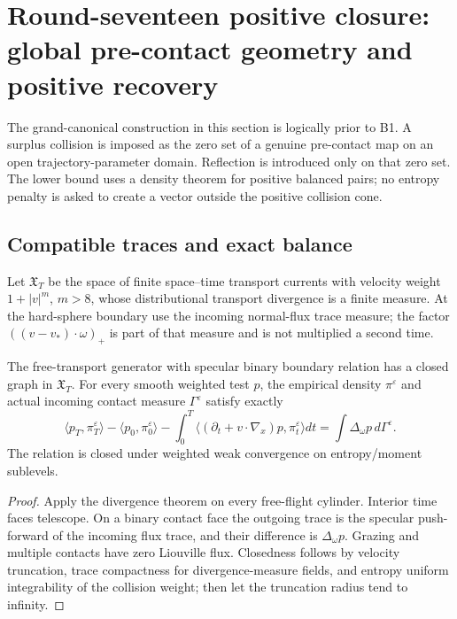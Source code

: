 \section{Round-seventeen positive closure: global pre-contact geometry and positive recovery}
\label{sec:r17-b2}

The grand-canonical construction in this section is logically prior to B1.
A surplus collision is imposed as the zero set of a genuine pre-contact map
on an open trajectory-parameter domain.  Reflection is introduced only on
that zero set.  The lower bound uses a density theorem for positive balanced
pairs; no entropy penalty is asked to create a vector outside the positive
collision cone.

\subsection{Compatible traces and exact balance}

Let \(\mathfrak X_T\) be the space of finite space--time transport currents
with velocity weight \(1+|v|^m\), \(m>8\), whose distributional transport
divergence is a finite measure.  At the hard-sphere boundary use the incoming
normal-flux trace measure; the factor
\(((v-v_*)\cdot\omega)_+\) is part of that measure and is not multiplied a
second time.

\begin{theorem}
\label{thm:r17-b2-trace}
The free-transport generator with specular binary boundary relation has a
closed graph in \(\mathfrak X_T\).  For every smooth weighted test \(p\), the
empirical density \(\pi^\varepsilon\) and actual incoming contact measure
\(\Gamma^\varepsilon\) satisfy exactly
\[
 \langle p_T,\pi_T^\varepsilon\rangle-
 \langle p_0,\pi_0^\varepsilon\rangle-
 \int_0^T\langle(\partial_t+v\cdot\nabla_x)p,
                  \pi_t^\varepsilon\rangle dt
 =\int\Delta_\omega p\,d\Gamma^\varepsilon.
\]
The relation is closed under weighted weak convergence on entropy/moment
sublevels.
\end{theorem}

\begin{proof}
Apply the divergence theorem on every free-flight cylinder.  Interior time
faces telescope.  On a binary contact face the outgoing trace is the
specular push-forward of the incoming flux trace, and their difference is
\(\Delta_\omega p\).  Grazing and multiple contacts have zero Liouville flux.
Closedness follows by velocity truncation, trace compactness for
divergence-measure fields, and entropy uniform integrability of the collision
weight; then let the truncation radius tend to infinity.
\end{proof}

